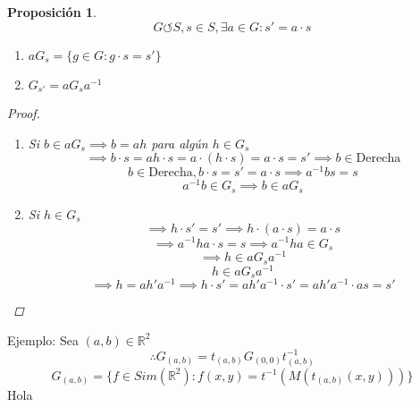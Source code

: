 \documentclass[11pt]{book}
\newtheorem{prop}[thm]{Proposición}
\theoremstyle{definition}
\begin{document}
\begin{prop}
	\[G\circlearrowleft S, s\in S,\exists a\in G: s'=a\cdot s\]
	\begin{enumerate}[label=(\alph*)]
		\item $aG_s=\{g\in G:g\cdot s=s'\}$

		\item $G_{s'}=aG_sa^{-1}$
	\end{enumerate}
	\begin{proof}
		\begin{enumerate}[label=(\alph*)]
			\item Si $b\in aG_s\implies b=ah$ para algún $h\in G_s$
			\[\implies b\cdot s=ah\cdot s= a\cdot(h\cdot s)=a\cdot s= s'\implies b\in\textrm{Derecha}\]
			\[ b\in\textrm{Derecha}, b\cdot s=s'=a\cdot s\implies a^{-1}bs=s\]
			\[a^{-1}b\in G_s\implies b\in aG_s\]

			\item Si $h\in G_s$
			\[\implies h\cdot s'=s'\implies h\cdot(a\cdot s)=a\cdot s\]
			\[\implies a^{-1}ha\cdot s=s\implies a^{-1}ha\in G_s\]
			\[\implies h\in aG_sa^{-1}\]
			\[h\in aG_sa^{-1}\]
			\[\implies h=ah'a^{-1}\implies h\cdot s'=ah'a^{-1}\cdot s'=ah'a^{-1}\cdot as=s'\]
		\end{enumerate}
	\end{proof}
\end{prop}
Ejemplo: Sea $(a,b)\in\mathbb{R}^2$
\[\therefore G_{(a,b)}=t_{(a,b)}G_{(0,0)}t^{-1}_{(a,b)}\]
\[G_{(a,b)}=\{f\in Sim(\mathbb{R}^2):f(x,y)=t^{-1}(M(t_{(a,b)}(x,y)))\}\]
Hola
\end{document}
